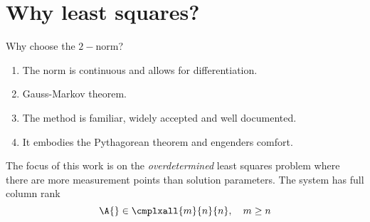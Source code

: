 \section{Why least squares?}
Why choose the $2-$norm?
\begin{enumerate}
%
  \item The norm is continuous and allows for differentiation.
%
  \item Gauss-Markov theorem.
%
  \item The method is familiar, widely accepted and well documented.
%
  \item It embodies the Pythagorean theorem and engenders comfort.
%
\end{enumerate}

The focus of this work is on the {\it{overdetermined}} least squares problem where there are more measurement points than solution parameters. The system has full column rank
$$
  \A{} \in \cmplxall{m}{n}{n}, \quad m \ge n
$$


\endinput